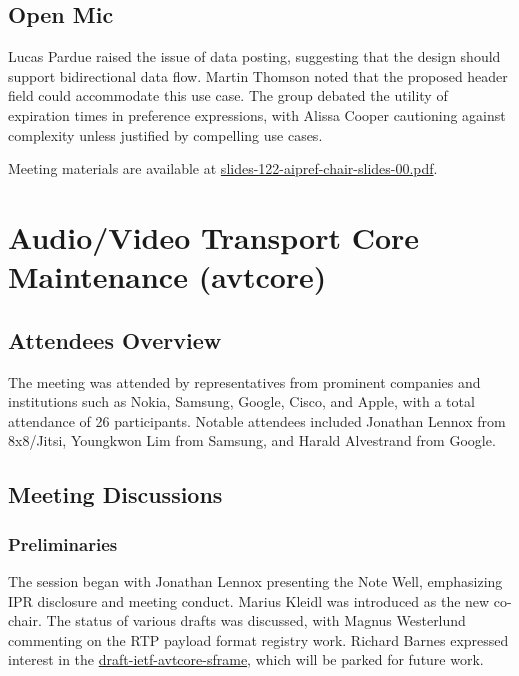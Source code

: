 \documentclass{article}
\begin{document}
\subsection{Open Mic}
Lucas Pardue raised the issue of data posting, suggesting that the design should support bidirectional data flow. Martin Thomson noted that the proposed header field could accommodate this use case. The group debated the utility of expiration times in preference expressions, with Alissa Cooper cautioning against complexity unless justified by compelling use cases.

Meeting materials are available at \href{https://datatracker.ietf.org/meeting/122/materials/slides-122-aipref-chair-slides-00.pdf}{slides-122-aipref-chair-slides-00.pdf}.




\newpage

\section{Audio/Video Transport Core Maintenance (avtcore)}

\subsection{Attendees Overview}
The meeting was attended by representatives from prominent companies and institutions such as Nokia, Samsung, Google, Cisco, and Apple, with a total attendance of 26 participants. Notable attendees included Jonathan Lennox from 8x8/Jitsi, Youngkwon Lim from Samsung, and Harald Alvestrand from Google.

\subsection{Meeting Discussions}

\subsubsection{Preliminaries}
The session began with Jonathan Lennox presenting the Note Well, emphasizing IPR disclosure and meeting conduct. Marius Kleidl was introduced as the new co-chair. The status of various drafts was discussed, with Magnus Westerlund commenting on the RTP payload format registry work. Richard Barnes expressed interest in the \href{https://datatracker.ietf.org/doc/html/draft-ietf-avtcore-sframe}{draft-ietf-avtcore-sframe}, which will be parked for future work.
\end{document}
